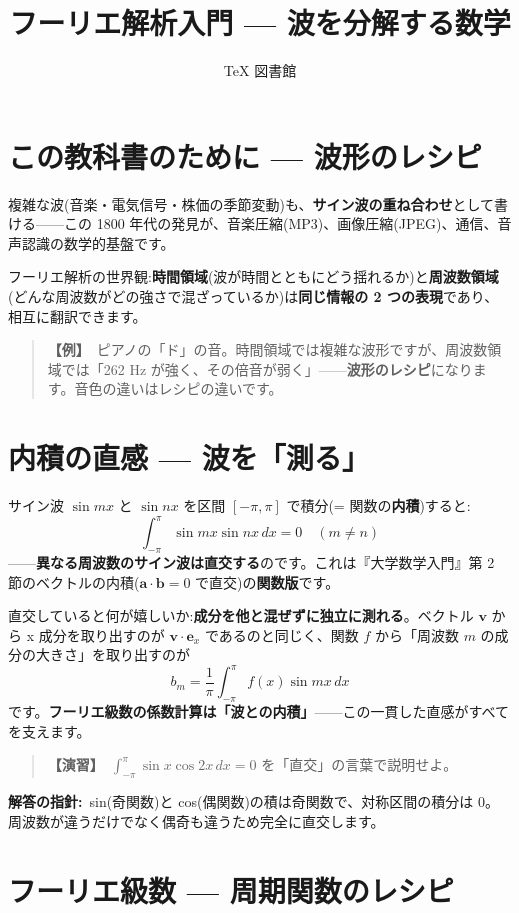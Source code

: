 \documentclass{article}
\title{フーリエ解析入門 — 波を分解する数学}
\author{TeX 図書館}
\begin{document}
\section{この教科書のために — 波形のレシピ}

複雑な波(音楽・電気信号・株価の季節変動)も、\textbf{サイン波の重ね合わせ}として書ける——この 1800 年代の発見が、音楽圧縮(MP3)、画像圧縮(JPEG)、通信、音声認識の数学的基盤です。

フーリエ解析の世界観:\textbf{時間領域}(波が時間とともにどう揺れるか)と\textbf{周波数領域}(どんな周波数がどの強さで混ざっているか)は\textbf{同じ情報の 2 つの表現}であり、相互に翻訳できます。

\begin{quote}
\textbf{【例】}\ ピアノの「ド」の音。時間領域では複雑な波形ですが、周波数領域では「262 Hz が強く、その倍音が弱く」——\textbf{波形のレシピ}になります。音色の違いはレシピの違いです。
\end{quote}

\section{内積の直感 — 波を「測る」}

サイン波 \(\sin mx\) と \(\sin nx\) を区間 \([-\pi, \pi]\) で積分(= 関数の\textbf{内積})すると:
\[ \int_{-\pi}^{\pi} \sin mx \sin nx \, dx = 0 \quad (m \neq n) \]
——\textbf{異なる周波数のサイン波は直交する}のです。これは『大学数学入門』第 2 節のベクトルの内積(\(\boldsymbol{a} \cdot \boldsymbol{b} = 0\) で直交)の\textbf{関数版}です。

直交していると何が嬉しいか:\textbf{成分を他と混ぜずに独立に測れる}。ベクトル \(\boldsymbol{v}\) から x 成分を取り出すのが \(\boldsymbol{v} \cdot \boldsymbol{e}_x\) であるのと同じく、関数 \(f\) から「周波数 \(m\) の成分の大きさ」を取り出すのが
\[ b_m = \frac{1}{\pi} \int_{-\pi}^{\pi} f(x) \sin mx \, dx \]
です。\textbf{フーリエ級数の係数計算は「波との内積」}——この一貫した直感がすべてを支えます。

\begin{quote}
\textbf{【演習】}\ \(\int_{-\pi}^{\pi} \sin x \cos 2x \, dx = 0\) を「直交」の言葉で説明せよ。
\end{quote}

\textbf{解答の指針:}\ sin(奇関数)と cos(偶関数)の積は奇関数で、対称区間の積分は 0。周波数が違うだけでなく偶奇も違うため完全に直交します。

\section{フーリエ級数 — 周期関数のレシピ}
\end{document}
